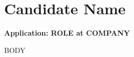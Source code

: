 \documentclass[11pt]{article}
\begin{document}
\section*{Candidate Name}
\textbf{Application: {{ROLE}} at {{COMPANY}}}

{{BODY}}
\end{document}
